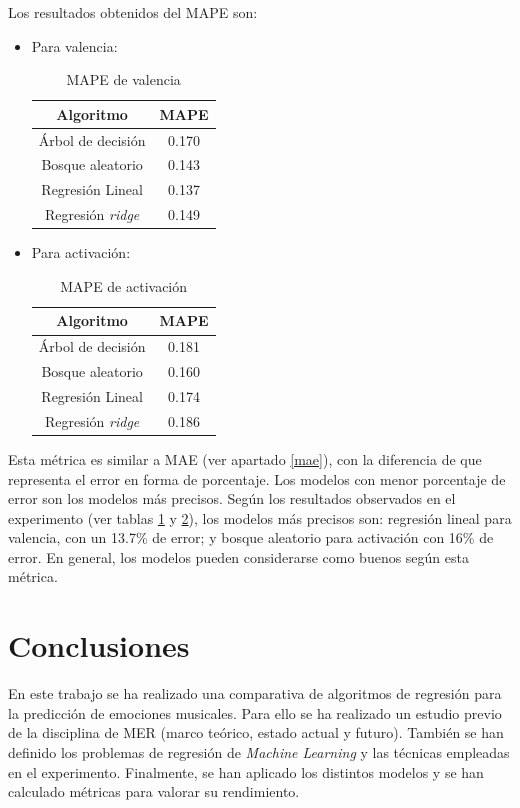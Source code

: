 \documentclass[12pt,a4paper]{article}
\begin{document}
Los resultados obtenidos del MAPE son:
\begin{itemize}
	\item Para valencia:
	\begin{table}[H]
		\centering
		\caption{MAPE de valencia}
		\label{tab:mapevalencia}
		\begin{tabular}{|c|c|}
			\hline
			\textbf{Algoritmo} & \textbf{MAPE} \\
			\hline
			Árbol de decisión & 0.170 \\
			Bosque aleatorio & 0.143 \\
			Regresión Lineal & 0.137 \\
			Regresión \textit{ridge} & 0.149 \\
			\hline
		\end{tabular}
	\end{table}
	\item Para activación:
	\begin{table}[H]
		\centering
		\caption{MAPE de activación}
		\label{tab:mapeactivacion}
		\begin{tabular}{|c|c|}
			\hline
			\textbf{Algoritmo} & \textbf{MAPE} \\
			\hline
			Árbol de decisión & 0.181 \\
			Bosque aleatorio & 0.160 \\
			Regresión Lineal & 0.174 \\
			Regresión \textit{ridge} & 0.186 \\
			\hline
		\end{tabular}
	\end{table}
\end{itemize}

Esta métrica es similar a MAE (ver apartado \ref{mae}), con la diferencia de que representa el error en forma de porcentaje. Los modelos con menor porcentaje de error son los modelos más precisos. Según los resultados observados en el experimento (ver tablas \ref{tab:mapevalencia} y \ref{tab:mapeactivacion}), los modelos más precisos son: regresión lineal para valencia, con un 13.7\% de error; y bosque aleatorio para activación con 16\% de error. En general, los modelos pueden considerarse como buenos según esta métrica. 










\newpage
\section{Conclusiones}
En este trabajo se ha realizado una comparativa de algoritmos de regresión para la predicción de emociones musicales. Para ello se ha realizado un estudio previo de la disciplina de MER (marco teórico, estado actual y futuro). También se han definido los problemas de regresión de \textit{Machine Learning} y las técnicas empleadas en el experimento. Finalmente, se han aplicado los distintos modelos y se han calculado métricas para valorar su rendimiento.
\end{document}
